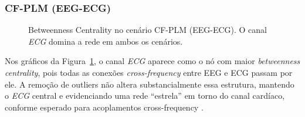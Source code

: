 \subsubsection{CF-PLM (EEG-ECG)}
\begin{figure}[htb]
    \centering
    \quad
    \caption{Betweenness Centrality no cenário CF-PLM (EEG-ECG). O canal \emph{ECG} domina a rede em ambos os cenários.}
    \label{fig:bc_cfplm_eegecg}
\end{figure}

Nos gráficos da Figura~\ref{fig:bc_cfplm_eegecg}, o canal \emph{ECG} aparece como o nó com maior \emph{betweenness centrality}, pois todas as conexões \emph{cross-frequency} entre EEG e ECG passam por ele. A remoção de outliers não altera substancialmente essa estrutura, mantendo o \emph{ECG} central e evidenciando uma rede “estrela” em torno do canal cardíaco, conforme esperado para acoplamentos cross-frequency \cite{bullmore2009complex}.

